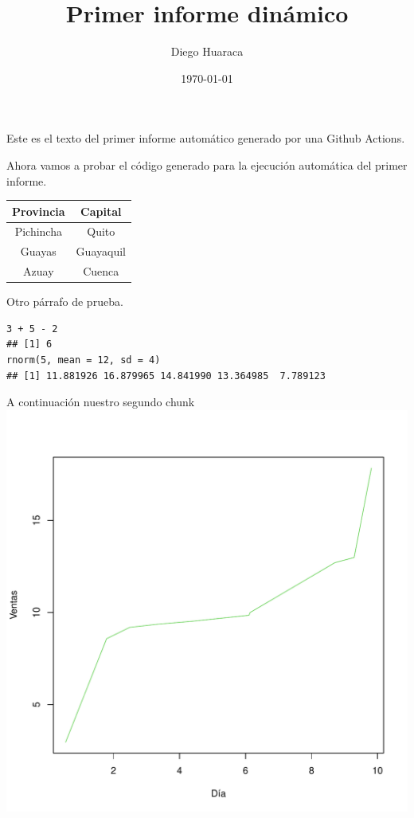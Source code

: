 \documentclass[12pt, a4paper]{book}\usepackage[]{graphicx}\usepackage[]{xcolor}
\title{Primer informe dinámico}
\author{Diego Huaraca}
\date{\today}
\makeatletter
\def\maxwidth{ %
  \ifdim\Gin@nat@width>\linewidth
    \linewidth
  \else
    \Gin@nat@width
  \fi
}
\newenvironment{kframe}{%
 \def\at@end@of@kframe{}%
 \ifinner\ifhmode%
  \def\at@end@of@kframe{\end{minipage}}%
  \begin{minipage}{\columnwidth}%
 \fi\fi%
 \def\FrameCommand##1{\hskip\@totalleftmargin \hskip-\fboxsep
 \colorbox{shadecolor}{##1}\hskip-\fboxsep
     \hskip-\linewidth \hskip-\@totalleftmargin \hskip\columnwidth}%
 \MakeFramed {\advance\hsize-\width
   \@totalleftmargin\z@ \linewidth\hsize
   \@setminipage}}%
 {\par\unskip\endMakeFramed%
 \at@end@of@kframe}
\newenvironment{knitrout}{}{} %
\makeatother
\begin{document}
\maketitle

Este es el texto del primer informe automático generado por una Github Actions.\newline

Ahora vamos a probar el código generado para la ejecución automática del primer informe.

\begin{table}[H]
\centering
\begin{tabular}{|c|c|}\hline
\textbf{Provincia} & \textbf{Capital}\\ \hline
Pichincha & Quito\\ \hline
Guayas & Guayaquil\\ \hline
Azuay & Cuenca\\ \hline
\end{tabular}
\end{table}

Otro párrafo de prueba.




\begin{knitrout}
\color{fgcolor}\begin{kframe}
\begin{verbatim}
3 + 5 - 2
## [1] 6
rnorm(5, mean = 12, sd = 4)
## [1] 11.881926 16.879965 14.841990 13.364985  7.789123
\end{verbatim}
\end{kframe}
\end{knitrout}

A continuación nuestro segundo chunk
\begin{knitrout}
\color{fgcolor}
\includegraphics[width=\maxwidth]{figure/chunk02-1} 
\end{knitrout}
\end{document}
